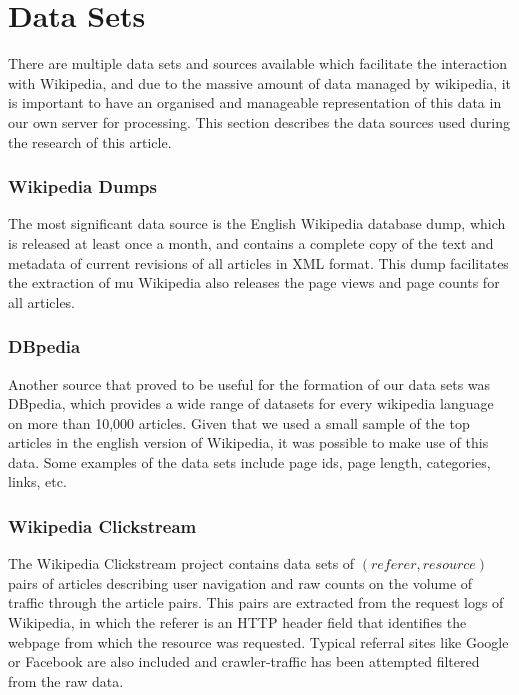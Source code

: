 \section{Data Sets}

There are multiple data sets and sources available which facilitate the interaction with Wikipedia, and due to the massive amount of data managed by wikipedia, it is important to have an organised and manageable representation of this data in our own server for processing. This section describes the data sources used during the research of this article.

\subsubsection{Wikipedia Dumps}
The most significant data source is the English Wikipedia database dump, which is released at least once a month, and contains a complete copy of the text and metadata of current revisions of all articles in XML format. This dump facilitates the extraction of mu Wikipedia also releases the page views and page counts for all articles.

\subsubsection{DBpedia}
Another source that proved to be useful for the formation of our data sets was DBpedia, which provides a wide range of datasets for every wikipedia language on more than 10,000 articles. Given that we used a small sample of the top articles in the english version of Wikipedia, it was possible to make use of this data. Some examples of the data sets include page ids, page length, categories, links, etc.

\subsubsection{Wikipedia Clickstream}
The Wikipedia Clickstream \cite{wulczyn} project contains data sets of $(referer, resource)$ pairs of articles describing user navigation and raw counts on the volume of traffic through the article pairs. This pairs are extracted from the request logs of Wikipedia, in which the referer is an HTTP header field that identifies the webpage from which the resource was requested. Typical referral sites like Google or Facebook are also included and crawler-traffic has been attempted filtered from the raw data.